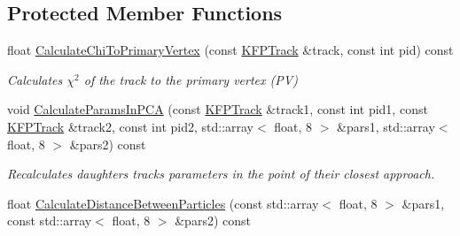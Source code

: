 \subsection*{Protected Member Functions}
\begin{DoxyCompactItemize}
\item 
float \hyperlink{classSimpleFinder_aba9d34b1412abc495838a6c5c99b997b}{Calculate\+Chi\+To\+Primary\+Vertex} (const \hyperlink{classKFPTrack}{K\+F\+P\+Track} \&track, const int pid) const \hypertarget{classSimpleFinder_aba9d34b1412abc495838a6c5c99b997b}{}\label{classSimpleFinder_aba9d34b1412abc495838a6c5c99b997b}

\begin{DoxyCompactList}\small\item\em Calculates $\chi^2$ of the track to the primary vertex (PV) \end{DoxyCompactList}\item 
void \hyperlink{classSimpleFinder_a6f67c15111fa7a4c19144acef48f7877}{Calculate\+Params\+In\+P\+CA} (const \hyperlink{classKFPTrack}{K\+F\+P\+Track} \&track1, const int pid1, const \hyperlink{classKFPTrack}{K\+F\+P\+Track} \&track2, const int pid2, std\+::array$<$ float, 8 $>$ \&pars1, std\+::array$<$ float, 8 $>$ \&pars2) const \hypertarget{classSimpleFinder_a6f67c15111fa7a4c19144acef48f7877}{}\label{classSimpleFinder_a6f67c15111fa7a4c19144acef48f7877}

\begin{DoxyCompactList}\small\item\em Recalculates daughters tracks\textquotesingle{} parameters in the point of their closest approach. \end{DoxyCompactList}\item 
float \hyperlink{classSimpleFinder_ab2ae6ae5184a0343e9256bf2a57fa3f4}{Calculate\+Distance\+Between\+Particles} (const std\+::array$<$ float, 8 $>$ \&pars1, const std\+::array$<$ float, 8 $>$ \&pars2) const \hypertarget{classSimpleFinder_ab2ae6ae5184a0343e9256bf2a57fa3f4}{}\label{classSimpleFinder_ab2ae6ae5184a0343e9256bf2a57fa3f4}


\end{DoxyCompactItemize}

